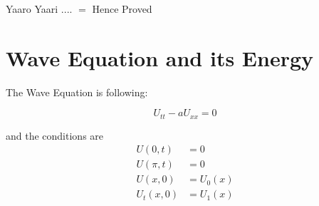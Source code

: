 Yaaro Yaari .... $=$ Hence Proved





\section{Wave Equation and its Energy}
The Wave Equation is following:

\begin{equation}
     U_{tt} - a{U}_{xx} = 0
\end{equation}

and the conditions are 
\begin{align*}
    U(0,t) &= 0\\
    U(\pi,t) &= 0\\
    U(x,0) &= U_{0}(x)\\
    U_{t}(x,0) &= U_{1}(x)
\end{align*}

